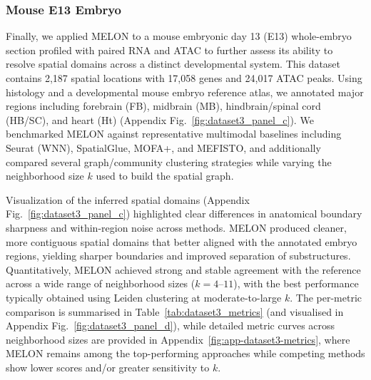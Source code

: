 \documentclass{article}
\theoremstyle{plain}
\theoremstyle{definition}
\begin{document}
\subsubsection{Mouse E13 Embryo}
Finally, we applied MELON to a mouse embryonic day 13 (E13) whole-embryo section profiled with paired RNA and ATAC to further assess its ability to resolve spatial domains across a distinct developmental system. This dataset contains 2,187 spatial locations with 17,058 genes and 24,017 ATAC peaks. Using histology and a developmental mouse embryo reference atlas, we annotated major regions including forebrain (FB), midbrain (MB), hindbrain/spinal cord (HB/SC), and heart (Ht) (Appendix Fig.~\ref{fig:dataset3_panel_c}). We benchmarked MELON against representative multimodal baselines including Seurat (WNN), SpatialGlue, MOFA+, and MEFISTO, and additionally compared several graph/community clustering strategies while varying the neighborhood size $k$ used to build the spatial graph.

Visualization of the inferred spatial domains (Appendix Fig.~\ref{fig:dataset3_panel_c}) highlighted clear differences in anatomical boundary sharpness and within-region noise across methods. MELON produced cleaner, more contiguous spatial domains that better aligned with the annotated embryo regions, yielding sharper boundaries and improved separation of substructures. Quantitatively, MELON achieved strong and stable agreement with the reference across a wide range of neighborhood sizes ($k=4$--$11$), with the best performance typically obtained using Leiden clustering at moderate-to-large $k$. The per-metric comparison is summarised in Table~\ref{tab:dataset3_metrics} (and visualised in Appendix Fig.~\ref{fig:dataset3_panel_d}), while detailed metric curves across neighborhood sizes are provided in Appendix~\ref{fig:app-dataset3-metrics}, where MELON remains among the top-performing approaches while competing methods show lower scores and/or greater sensitivity to $k$.
\end{document}
